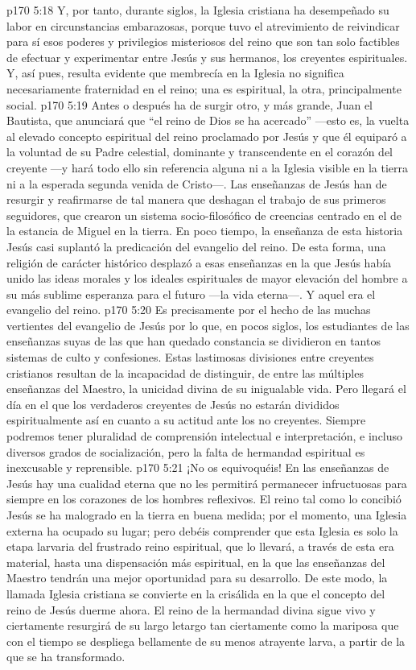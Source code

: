 \vs p170 5:18 Y, por tanto, durante siglos, la Iglesia cristiana ha desempeñado su labor en circunstancias embarazosas, porque tuvo el atrevimiento de reivindicar para sí esos poderes y privilegios misteriosos del reino que son tan solo factibles de efectuar y experimentar entre Jesús y sus hermanos, los creyentes espirituales. Y, así pues, resulta evidente que membrecía en la Iglesia no significa necesariamente fraternidad en el reino; una es espiritual, la otra, principalmente social.
\vs p170 5:19 Antes o después ha de surgir otro, y más grande, Juan el Bautista, que anunciará que “el reino de Dios se ha acercado” ---esto es, la vuelta al elevado concepto espiritual del reino proclamado por Jesús y que él equiparó a la voluntad de su Padre celestial, dominante y transcendente en el corazón del creyente ---y hará todo ello sin referencia alguna ni a la Iglesia visible en la tierra ni a la esperada segunda venida de Cristo---. Las enseñanzas  de Jesús han de resurgir y reafirmarse de tal manera que deshagan el trabajo de sus primeros seguidores, que crearon un sistema socio\hyp{}filosófico de creencias centrado en el  de la estancia de Miguel en la tierra. En poco tiempo, la enseñanza de esta historia  Jesús casi suplantó la predicación del evangelio del reino. De esta forma, una religión de carácter histórico desplazó a esas enseñanzas en la que Jesús había unido las ideas morales y los ideales espirituales de mayor elevación del hombre a su más sublime esperanza para el futuro ---la vida eterna---. Y aquel era el evangelio del reino.
\vs p170 5:20 Es precisamente por el hecho de las muchas vertientes del evangelio de Jesús por lo que, en pocos siglos, los estudiantes de las enseñanzas suyas de las que han quedado constancia se dividieron en tantos sistemas de culto y confesiones. Estas lastimosas divisiones entre creyentes cristianos resultan de la incapacidad de distinguir, de entre las múltiples enseñanzas del Maestro, la unicidad divina de su inigualable vida. Pero llegará el día en el que los verdaderos creyentes de Jesús no estarán divididos espiritualmente así en cuanto a su actitud ante los no creyentes. Siempre podremos tener pluralidad de comprensión intelectual e interpretación, e incluso diversos grados de socialización, pero la falta de hermandad espiritual es inexcusable y reprensible.
\vs p170 5:21 ¡No os equivoquéis! En las enseñanzas de Jesús hay una cualidad eterna que no les permitirá permanecer infructuosas para siempre en los corazones de los hombres reflexivos. El reino tal como lo concibió Jesús se ha malogrado en la tierra en buena medida; por el momento, una Iglesia externa ha ocupado su lugar; pero debéis comprender que esta Iglesia es solo la etapa larvaria del frustrado reino espiritual, que lo llevará, a través de esta era material, hasta una dispensación más espiritual, en la que las enseñanzas del Maestro tendrán una mejor oportunidad para su desarrollo. De este modo, la llamada Iglesia cristiana se convierte en la crisálida en la que el concepto del reino de Jesús duerme ahora. El reino de la hermandad divina sigue vivo y ciertamente resurgirá de su largo letargo tan ciertamente como la mariposa que con el tiempo se despliega bellamente de su menos atrayente larva, a partir de la que se ha transformado.
